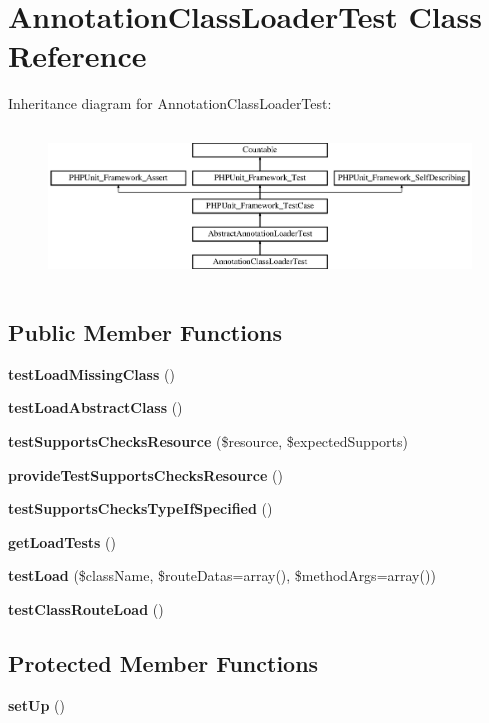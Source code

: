 \section{Annotation\+Class\+Loader\+Test Class Reference}
\label{class_symfony_1_1_component_1_1_routing_1_1_tests_1_1_loader_1_1_annotation_class_loader_test}
Inheritance diagram for Annotation\+Class\+Loader\+Test\+:\begin{figure}[H]
\begin{center}
\leavevmode
\includegraphics[height=4.129793cm]{class_symfony_1_1_component_1_1_routing_1_1_tests_1_1_loader_1_1_annotation_class_loader_test}
\end{center}
\end{figure}
\subsection*{Public Member Functions}
\begin{DoxyCompactItemize}
\item 
{\bf test\+Load\+Missing\+Class} ()
\item 
{\bf test\+Load\+Abstract\+Class} ()
\item 
{\bf test\+Supports\+Checks\+Resource} (\$resource, \$expected\+Supports)
\item 
{\bf provide\+Test\+Supports\+Checks\+Resource} ()
\item 
{\bf test\+Supports\+Checks\+Type\+If\+Specified} ()
\item 
{\bf get\+Load\+Tests} ()
\item 
{\bf test\+Load} (\$class\+Name, \$route\+Datas=array(), \$method\+Args=array())
\item 
{\bf test\+Class\+Route\+Load} ()
\end{DoxyCompactItemize}
\subsection*{Protected Member Functions}
\begin{DoxyCompactItemize}
\item 
{\bf set\+Up} ()
\end{DoxyCompactItemize}
